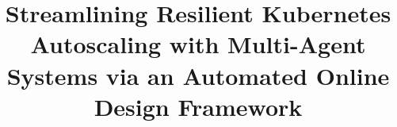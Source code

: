 \documentclass[conference]{IEEEtran}
\begin{document}
\title{Streamlining Resilient Kubernetes Autoscaling with Multi-Agent Systems via an Automated Online Design Framework
}

\author{










}
\end{document}
